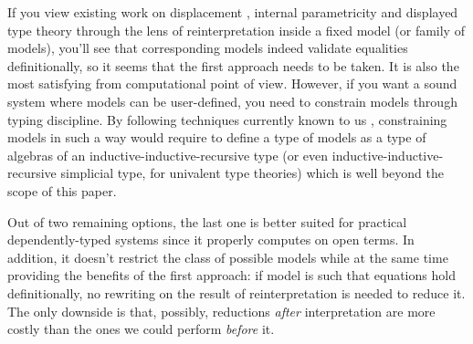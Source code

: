 If you view existing work on displacement
\cite{McBride:Crude2011, McBride:Crude2012}, internal
parametricity \cite{Altenkirch:Parametricity2024} and
displayed type theory \cite{Kolomatskaia_Shulman_2025}
through the lens of reinterpretation inside a fixed
model (or family of models), you'll see that
corresponding models indeed validate equalities
definitionally, so it seems that the first approach
needs to be taken. It is also the most satisfying from
computational point of view. However, if you want a
sound system where models can be user-defined, you need
to constrain models through typing discipline. By
following techniques currently known to us
\cite{bezem2021notegeneralizedalgebraictheories},
constraining models in such a way would require to
define a type of models as a type of algebras of an
inductive-inductive-recursive type (or even
inductive-inductive-recursive simplicial type, for
univalent type theories) which is well beyond the scope
of this paper.

Out of two remaining options, the last one is better
suited for practical dependently-typed systems since it
properly computes on open terms. In addition, it doesn't
restrict the class of possible models while at the same
time providing the benefits of the first approach: if
model is such that equations hold definitionally, no
rewriting on the result of reinterpretation is needed to
reduce it. The only downside is that, possibly,
reductions \textit{after} interpretation are more costly
than the ones we could perform \textit{before} it.
